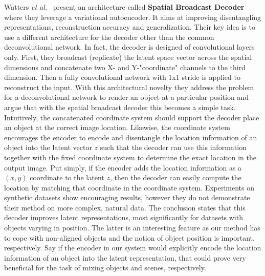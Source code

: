 \documentclass[12pt,a4paper]{article}
\begin{document}
\par Watters \textit{et al.}~\cite{SpatialBDecoder} present an architecture called \textbf{Spatial Broadcast Decoder} where they leverage a variational autoencoder. It aims at improving disentangling representations, reconstruction accuracy and generalization. Their key idea is to use a different architecture for the decoder other than the common deconvolutional network. In fact, the decoder is designed of convolutional layers only. First, they broadcast (replicate) the latent space vector across the spatial dimensions and concatenate two X- and Y-"coordinate" channels to the third dimension. Then a fully convolutional network with 1x1 stride is applied to reconstruct the input. With this architectural novelty they address the problem for a deconvolutional network to render an object at a particular position and argue that with the spatial broadcast decoder this becomes a simple task. Intuitively, the concatenated coordinate system should support the decoder place an object at the correct image location. Likewise, the coordinate system encourages the encoder to encode and disentangle the location information of an object into the latent vector $z$ such that the decoder can use this information together with the fixed coordinate system to determine the exact location in the output image. Put simply, if the encoder adds the location information as a $(x,y)$ coordinate to the latent $z$, then the decoder can easily compute the location by matching that coordinate in the coordinate system. Experiments on synthetic datasets show encouraging results, however they do not demonstrate their method on more complex, natural data. The conclusion states that this decoder improves latent representations, most significantly for datasets with objects varying in position. The latter is an interesting feature as our method has to cope with non-aligned objects and the notion of object position is important, respectively. Say if the encoder in our system would explicitly encode the location information of an object into the latent representation, that could prove very beneficial for the task of mixing objects and scenes, respectively.
\end{document}
